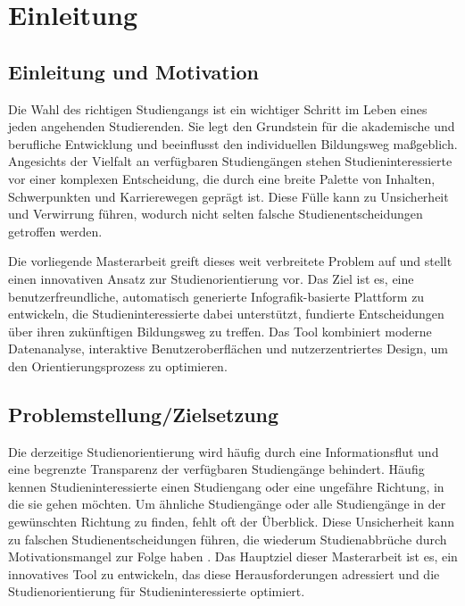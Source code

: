 \section{Einleitung}\label{einleitung}
\subsection{Einleitung und Motivation}\label{einleitung-und-motivation}
Die Wahl des richtigen Studiengangs ist ein wichtiger Schritt im Leben eines
jeden angehenden Studierenden. Sie legt den Grundstein für die akademische und
berufliche Entwicklung und beeinflusst den individuellen Bildungsweg maßgeblich.
Angesichts der Vielfalt an verfügbaren Studiengängen stehen Studieninteressierte
vor einer komplexen Entscheidung, die durch eine breite Palette von Inhalten, 
Schwerpunkten und Karrierewegen geprägt ist. Diese Fülle kann zu Unsicherheit
und Verwirrung führen, wodurch nicht selten falsche Studienentscheidungen
getroffen werden. \parencite{verbesserung-der-studienorientierung}

Die vorliegende Masterarbeit greift dieses weit verbreitete Problem auf und
stellt einen innovativen Ansatz zur Studienorientierung vor. Das Ziel ist es,
eine benutzerfreundliche, automatisch generierte Infografik-basierte Plattform
zu entwickeln, die Studieninteressierte dabei unterstützt, fundierte
Entscheidungen über ihren zukünftigen Bildungsweg zu treffen. Das Tool
kombiniert moderne Datenanalyse, interaktive Benutzeroberflächen und
nutzerzentriertes Design, um den Orientierungsprozess zu optimieren.

\subsection{Problemstellung/Zielsetzung}\label{problemstellung-zielsetzung}
Die derzeitige Studienorientierung wird häufig durch eine Informationsflut und
eine begrenzte Transparenz der verfügbaren Studiengänge behindert. Häufig kennen
Studieninteressierte einen Studiengang oder eine ungefähre Richtung, in die sie
gehen möchten. Um ähnliche Studiengänge oder alle Studiengänge in der
gewünschten Richtung zu finden, fehlt oft der Überblick.
\parencite{verbesserung-der-studienorientierung} Diese Unsicherheit kann
zu falschen Studienentscheidungen führen, die wiederum Studienabbrüche durch
Motivationsmangel zur Folge haben \parencite{ursachen-studienabbruch}. Das
Hauptziel dieser Masterarbeit ist es, ein innovatives Tool zu entwickeln, das
diese Herausforderungen adressiert und die Studienorientierung für
Studieninteressierte optimiert.

